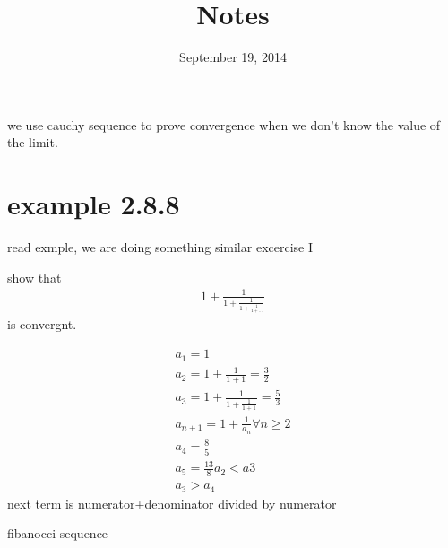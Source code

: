 \documentclass[letterpaper]{article}
\begin{document}
\title{Notes}
\date{September 19, 2014}
\maketitle
we use cauchy sequence to prove convergence when we don't know the value of the limit.
\section*{example 2.8.8}
read exmple, we are doing something similar
excercise I

show that \begin{align*}
  1+\frac{1}{1+\frac{1}{1+\frac{1}{1+\dots}}}
\end{align*}
is convergnt.

\begin{align*}
  a_1=1\\
  a_2=1+\frac{1}{1+1}=\frac{3}{2}\\
  a_3=1+\frac{1}{1+\frac{1}{1+1}}=\frac{5}{3}\\
  a_{n+1}=1+\frac{1}{a_n}\forall n\ge 2\\
  a_4=\frac{8}{5}\\
  a_5=\frac{13}{8}
  a_2<a3\\
  a_3>a_4
\end{align*}
next term is numerator+denominator divided by numerator

fibanocci sequence
\end{document}
